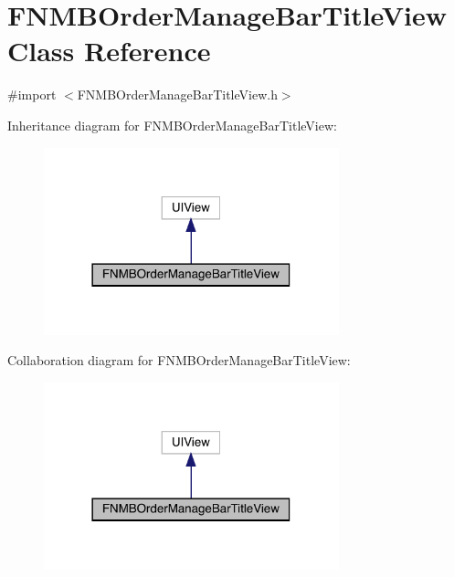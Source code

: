 \hypertarget{interface_f_n_m_b_order_manage_bar_title_view}{}\section{F\+N\+M\+B\+Order\+Manage\+Bar\+Title\+View Class Reference}
\label{interface_f_n_m_b_order_manage_bar_title_view}


{\ttfamily \#import $<$F\+N\+M\+B\+Order\+Manage\+Bar\+Title\+View.\+h$>$}



Inheritance diagram for F\+N\+M\+B\+Order\+Manage\+Bar\+Title\+View\+:\nopagebreak
\begin{figure}[H]
\begin{center}
\leavevmode
\includegraphics[width=242pt]{interface_f_n_m_b_order_manage_bar_title_view__inherit__graph}
\end{center}
\end{figure}


Collaboration diagram for F\+N\+M\+B\+Order\+Manage\+Bar\+Title\+View\+:\nopagebreak
\begin{figure}[H]
\begin{center}
\leavevmode
\includegraphics[width=242pt]{interface_f_n_m_b_order_manage_bar_title_view__coll__graph}
\end{center}
\end{figure}
